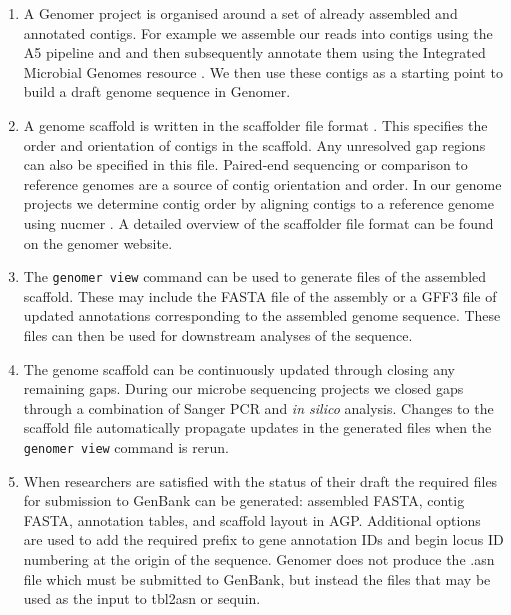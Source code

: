\documentclass[10pt]{article}
\begin{document}
\begin{enumerate}

  \item{A Genomer project is organised around a set of already assembled and
  annotated contigs. For example we assemble our reads into contigs using the
  A5 pipeline \cite{tritt2012} and and then subsequently annotate them using
  the Integrated Microbial Genomes resource \cite{markowitz2006}. We then use
  these contigs as a starting point to build a draft genome sequence in
  Genomer.}

  \item{A genome scaffold is written in the scaffolder file format
  \cite{barton2012}. This specifies the order and orientation of contigs in the
  scaffold. Any unresolved gap regions can also be specified in this file.
  Paired-end sequencing or comparison to reference genomes are a source of
  contig orientation and order. In our genome projects we determine contig
  order by aligning contigs to a reference genome using nucmer
  \cite{kurtz2004}. A detailed overview of the scaffolder file format can be
  found on the genomer website.}

  \item{The \verb+genomer view+ command can be used to generate files of the
  assembled scaffold. These may include the FASTA file of the assembly or a
  GFF3 file of updated annotations corresponding to the assembled genome
  sequence. These files can then be used for downstream analyses of the
  sequence.}

  \item{The genome scaffold can be continuously updated through closing any
  remaining gaps. During our microbe sequencing projects we closed gaps through
  a combination of Sanger PCR and \emph{in silico} analysis. Changes to the
  scaffold file automatically propagate updates in the generated files when the
  \verb+genomer view+ command is rerun.}

  \item{When researchers are satisfied with the status of their draft the
  required files for submission to GenBank can be generated: assembled FASTA,
  contig FASTA, annotation tables, and scaffold layout in AGP. Additional
  options are used to add the required prefix to gene annotation IDs and begin
  locus ID numbering at the origin of the sequence. Genomer does not produce
  the .asn file which must be submitted to GenBank, but instead the files that
  may be used as the input to tbl2asn or sequin. }

\end{enumerate}
\end{document}
